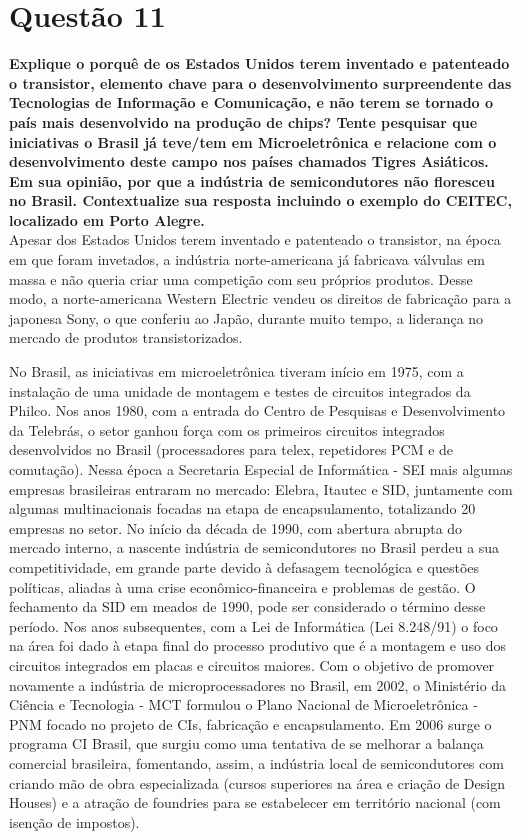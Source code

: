 
\section{Questão 11}
\label{sec:q11}
\textbf{Explique o porquê de os Estados Unidos terem inventado e patenteado o transistor, elemento chave para o desenvolvimento surpreendente das Tecnologias de Informação e Comunicação, e não terem se tornado o país mais desenvolvido na produção de chips? Tente pesquisar que iniciativas o Brasil já teve/tem em Microeletrônica e relacione com o desenvolvimento deste campo nos países chamados Tigres Asiáticos. Em sua opinião, por que a indústria de semicondutores não floresceu no Brasil. Contextualize sua resposta incluindo o exemplo do CEITEC, localizado em Porto Alegre.} \\

Apesar dos Estados Unidos terem inventado e patenteado o transistor, na época em que foram invetados, a indústria norte-americana já fabricava válvulas em massa e não queria criar uma competição com seu próprios produtos. Desse modo, a norte-americana Western Electric vendeu os direitos de fabricação para a japonesa Sony, o que conferiu ao Japão, durante muito tempo, a liderança no mercado de produtos transistorizados.

No Brasil, as iniciativas em microeletrônica tiveram início em 1975, com a instalação de uma unidade de montagem e testes de circuitos integrados da Philco. Nos anos 1980, com a entrada do Centro de Pesquisas e Desenvolvimento da Telebrás, o setor ganhou força com os primeiros circuitos integrados desenvolvidos no Brasil (processadores para telex, repetidores PCM e de comutação). Nessa época a Secretaria Especial de Informática - SEI mais algumas empresas brasileiras entraram no mercado: Elebra, Itautec e SID, juntamente com algumas multinacionais focadas na etapa de encapsulamento, totalizando 20 empresas no setor. No início da década de 1990, com abertura abrupta do mercado interno, a nascente indústria de semicondutores no Brasil perdeu a sua competitividade, em grande parte devido à defasagem tecnológica e questões políticas, aliadas à uma crise econômico-financeira e problemas de gestão. O fechamento da SID em meados de 1990, pode ser considerado o término desse período. Nos anos subsequentes, com a Lei de Informática (Lei 8.248/91) o foco na área foi dado à etapa final do processo produtivo que é a montagem e uso dos circuitos integrados em placas e circuitos maiores. Com o objetivo de promover novamente a indústria de microprocessadores no Brasil, em 2002, o Ministério da Ciência e Tecnologia - MCT formulou o Plano Nacional de Microeletrônica - PNM focado no projeto de CIs, fabricação e encapsulamento. Em 2006 surge o programa CI Brasil, que surgiu como uma tentativa de se melhorar a balança comercial brasileira, fomentando, assim, a indústria local de semicondutores com criando mão de obra especializada (cursos superiores na área e criação de Design Houses) e a atração de foundries para se estabelecer em território nacional (com isenção de impostos).

